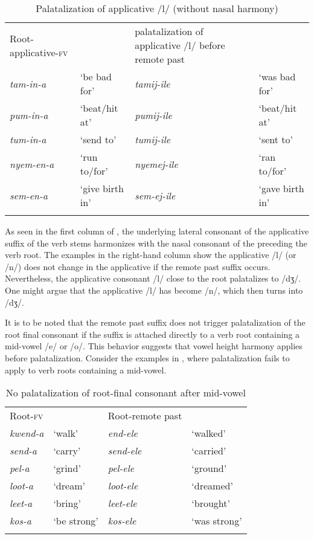 \documentclass[output=paper]{langsci/langscibook}
\begin{document}
\begin{table}
\begin{tabular}{llll}
\lsptoprule
Root-applicative-\textsc{fv} &  & palatalization of applicative /l/ before remote past & \\
\textit{tam-in-a} & `be bad for' & \textit{tamij-ile} & `was bad for' \\
\textit{pum-in-a} & `beat/hit at' & \textit{pumij-ile} & `beat/hit at' \\
\textit{tum-in-a} & `send to' & \textit{tumij-ile} & `sent to' \\
\textit{nyem-en-a} & `run to/for' & \textit{nyemej-ile} & `ran to/for' \\
\textit{sem-en-a} & `give birth in' & \textit{sem-ej-ile} & `gave birth in' \\

\lspbottomrule
\end{tabular}

\caption{Palatalization of applicative /l/ (without nasal harmony)}
\label{tab:15.kawasha}

\end{table}

As seen in the first column of , the underlying lateral consonant of the applicative suffix of the verb stems harmonizes with the nasal consonant of the preceding the verb root. The examples in the right-hand column show the applicative /l/ (or /n/) does not change in the applicative if the remote past suffix occurs. Nevertheless, the applicative consonant /l/ close to the root palatalizes to /dʒ/. One might argue that the applicative /l/ has become /n/, which then turns into /dʒ/. 

It is to be noted that the remote past suffix does not trigger palatalization of the root final consonant if the suffix is attached directly to a verb root containing a mid-vowel /e/ or /o/. This behavior suggests that vowel height harmony applies before palatalization. Consider the examples in , where palatalization fails to apply to verb roots containing a mid-vowel. 


\begin{table}
\begin{tabular}{llll}
\lsptoprule
Root-\textsc{fv} &  & Root-remote past & \\
\textit{kwend-a} & `walk' & \textit{end-ele} & `walked' \\
\textit{send-a} & `carry' & \textit{send-ele} & `carried' \\
\textit{pel-a} & `grind' & \textit{pel-ele} & `ground' \\
\textit{loot-a} & `dream' & \textit{loot-ele} & `dreamed' \\
\textit{leet-a} & `bring' & \textit{leet-ele} & `brought' \\
\textit{kos-a} & `be strong' & \textit{kos-ele} & `was strong' \\

\lspbottomrule
\end{tabular}

\caption{No palatalization of root-final consonant after mid-vowel }
\label{tab:16.kawasha}

\end{table}
\end{document}
